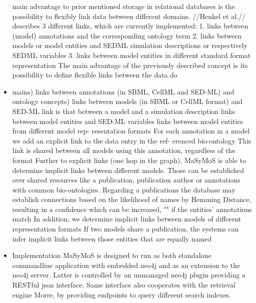 \begin{itemize}
	\subitem main advantage to prior mentioned storage in relational databases is the possibility to flexibly link data between different domains. //Henkel et al.// describes 3 different links, which are currently implemented: 1. links between (model) annotations and the corresponding ontology term 2. links between models or model entities and SEDML simulation descriptions or respectively SEDML variables 3. links between model entities in different standard format representation
	\subsubitem \cite{Henkel2015} The main advantage of the previously described concept is its possibility to define flexible links between the data do\item mains)
	\subsubitem \cite{Henkel2015} links between annotations (in SBML, CellML and SED-ML) and ontology concepts)
	\subsubitem \cite{Henkel2015} links between models (in SBML or CellML format) and SED-ML
	\subsubitem \cite{Henkel2015} link is that between a model and a simulation description
	\subsubitem \cite{Henkel2015} links between model entities and SED-ML variables
	\subsubitem \cite{Henkel2015} links between model entities from different model rep- resentation formats
	\subitem \cite{Henkel2015} For each annotation in a model we add an explicit link to the data entry in the ref- erenced bio-ontology
	\subitem This link is shared between all models using this annotation, regardless of the format
	\subitem Further to explicit links (one hop in the graph), MaSyMoS is able to determine implicit links between different models. Those can be established over shared resources like a publication, publication author or annotations with common bio-ontologies. Regarding a publications the database may establish connections based on the likelihood of names by Hemming Distance, resulting in a confidence which can be increased, "" if the entities' annotations match
	\subsubitem \cite{Henkel2015} In addition, we determine implicit links between models of different representation formats
	\subsubitem \cite{Henkel2015} If two models share a publication, the systems can infer implicit links between those entities that are equally named
	\item Implementation
	\subitem MaSyMoS is designed to run as both standalone commandline application with embedded neo4j and as an extension to the neo4j server. Latter is controlled by an unmanaged neo4j plugin providing a RESTful json interface.
	\subitem Same interface also cooperates with the retrieval engine Morre, by providing endpoints to query different search indexes.
	

\end{itemize}
